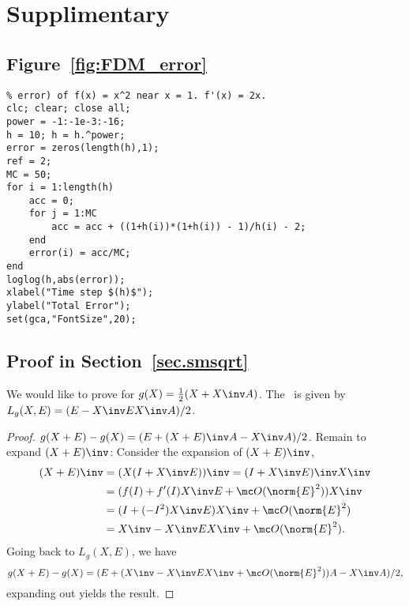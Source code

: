 \appendix
\section{Supplimentary}
\subsection{Figure~\ref{fig:FDM_error}}\label{app.fdm_error}
\begin{lstlisting}[numbers=none]
% we would like to find the total error (truncation error + roundoff
% error) of f(x) = x^2 near x = 1. f'(x) = 2x.
clc; clear; close all;
power = -1:-1e-3:-16;
h = 10; h = h.^power;
error = zeros(length(h),1);
ref = 2; 
MC = 50;
for i = 1:length(h)
    acc = 0;
    for j = 1:MC
        acc = acc + ((1+h(i))*(1+h(i)) - 1)/h(i) - 2;
    end
    error(i) = acc/MC;
end
loglog(h,abs(error));
xlabel("Time step $(h)$");
ylabel("Total Error");
set(gca,"FontSize",20);
\end{lstlisting}

\subsection{Proof in Section~\ref{sec.smsqrt}}\label{app.proof_smsqrt}
We would like to prove for $g(X) = \frac{1}{2}(X +X\inv A)$. The \FD\ is
given by $L_{g}(X,E) = (E-X\inv EX\inv A)/2$.

\begin{proof}
    $g(X+E)-g(X) = (E + (X+E)\inv A - X\inv A)/2$. Remain to expand
    $(X+E)\inv$: Consider the expansion of $(X+E)\inv$,
    \begin{equation}\notag
        \begin{aligned}
            (X+E)\inv & = (X(I+X\inv E))\inv = (I+X\inv E)\inv X\inv \\
            & = (f(I) + f'(I)X\inv E + \mc O(\norm{E}^2))X\inv \\
            & = (I + (-I^2)X\inv E)X\inv + \mc O(\norm{E}^2)\\
            & = X\inv - X\inv EX \inv + \mc O(\norm{E}^2).
        \end{aligned}
    \end{equation}
    Going back to $L_{g}(X,E)$, we have 
    \begin{equation}\notag
        g(X+E)-g(X)=(E+ (X\inv - X\inv EX \inv + \mc O(\norm{E}^2))A - X\inv A)/2,
    \end{equation}
    expanding out yields the result.
\end{proof}